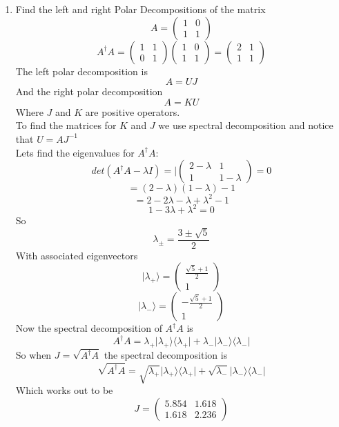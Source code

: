 \documentclass[12pt]{article}
\newcommand{\ket}[1]{\vert{#1}\rangle}
\newcommand{\bra}[1]{\langle{#1}\vert}
\begin{document}
\begin{enumerate}
\item Find the left and right Polar Decompositions of the matrix 
$$ A =  \left( \begin{array}{cc} 1 & 0 \\ 1 & 1\end{array} \right) $$
$$ A^\dagger A = \left( \begin{array}{cc} 1 & 1 \\ 0 & 1\end{array} \right)  \left( \begin{array}{cc} 1 & 0 \\ 1 & 1\end{array} \right) =  \left( \begin{array}{cc} 2 & 1 \\ 1 & 1\end{array} \right) $$
The left polar decomposition is 
$$ A = UJ $$
And the right polar decomposition 
$$ A = KU $$
Where $J$ and $K$ are positive operators. 
\\
To find the matrices for $K$ and $J$ we use spectral decomposition and notice that $U=AJ^{-1} $
\\
Lets find the eigenvalues for $A^\dagger A $:
$$ det(A^\dagger A - \lambda I ) = |  \left( \begin{array}{cc} 2- \lambda & 1 \\ 1 & 1- \lambda \end{array} \right) = 0 $$
$$ = (2- \lambda ) (1- \lambda) - 1 $$
$$ = 2- 2\lambda -\lambda + \lambda^2 -1 $$
$$ 1 - 3\lambda + \lambda^2 =0 $$
So $$\lambda_{\pm} = \frac{3 \pm \sqrt{5}}{2}$$
With associated eigenvectors 
$$ \ket{\lambda_+} = \left( \begin{array}{cc} \frac{\sqrt{5}+1}{2} \\ 1\end{array} \right)$$
$$ \ket{\lambda_-} = \left( \begin{array}{cc} -\frac{\sqrt{5}+1}{2} \\ 1\end{array} \right)$$
Now the spectral decomposition of $A^\dagger A$ is 
$$ A^\dagger A = \lambda_+ \ket{\lambda_+}\bra{\lambda_+} + \lambda_- \ket{\lambda_-}\bra{\lambda_-} $$
So when $J = \sqrt{A^\dagger A} $ the spectral decomposition is
$$ \sqrt{A^\dagger A} = \sqrt{\lambda_+} \ket{\lambda_+}\bra{\lambda_+} + \sqrt{\lambda_-} \ket{\lambda_-}\bra{\lambda_-} $$
Which works out to be 
$$ J = \left( \begin{array}{cc} 5.854 & 1.618 \\ 1.618 & 2.236 \end{array} \right) $$ 

\end{enumerate}
\end{document}
